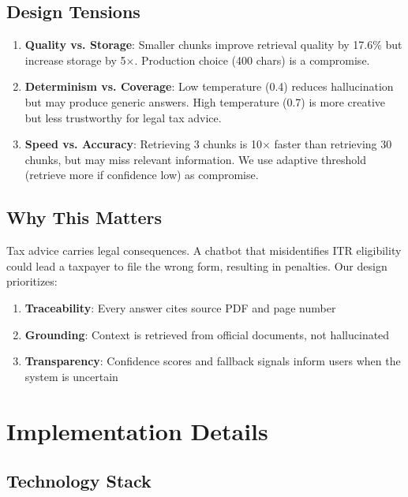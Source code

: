 \documentclass[11pt,a4paper]{article}
\begin{document}
\subsection{Design Tensions}

\begin{enumerate}
    \item \textbf{Quality vs. Storage}: Smaller chunks improve retrieval quality by 17.6\% but increase storage by 5$\times$. Production choice (400 chars) is a compromise.
    
    \item \textbf{Determinism vs. Coverage}: Low temperature (0.4) reduces hallucination but may produce generic answers. High temperature (0.7) is more creative but less trustworthy for legal tax advice.
    
    \item \textbf{Speed vs. Accuracy}: Retrieving 3 chunks is 10$\times$ faster than retrieving 30 chunks, but may miss relevant information. We use adaptive threshold (retrieve more if confidence low) as compromise.
\end{enumerate}

\subsection{Why This Matters}

Tax advice carries legal consequences. A chatbot that misidentifies ITR eligibility could lead a taxpayer to file the wrong form, resulting in penalties. Our design prioritizes:
\begin{enumerate}
    \item \textbf{Traceability}: Every answer cites source PDF and page number
    \item \textbf{Grounding}: Context is retrieved from official documents, not hallucinated
    \item \textbf{Transparency}: Confidence scores and fallback signals inform users when the system is uncertain
\end{enumerate}

\section{Implementation Details}
\label{sec:implementation}

\subsection{Technology Stack}
\end{document}

